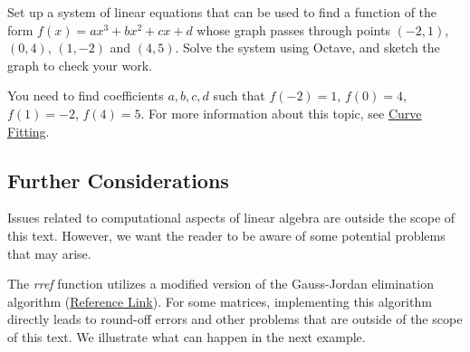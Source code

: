 \documentclass{ximera}
\begin{document}
\begin{problem}\label{prob_oct_sys_4}
    Set up a system of linear equations that can be used to find a function of the form $f(x)=ax^3+bx^2+cx+d$ whose graph passes through points $(-2, 1)$, $(0, 4)$, $(1, -2)$ and $(4, 5)$.   Solve the system using Octave, and sketch the graph to check your work.
    
    \begin{hint}
        You need to find coefficients $a, b, c, d$ such that $f(-2)=1$, $f(0)=4$, $f(1)=-2$, $f(4)=5$.  For more information about this topic, see \href{https://ximera.osu.edu/linearalgebradzv3/LinearAlgebraInteractiveIntro/APP-0070/main}{Curve Fitting}.
    \end{hint}
    

    \begin{center} 
    \end{center}
   
\end{problem}

\subsection*{Further Considerations}
Issues related to computational aspects of linear algebra are outside the scope of this text.  However, we want the reader to be aware of some potential problems that may arise.

\begin{warning}
    The \emph{rref} function utilizes a modified version of the Gauss-Jordan elimination algorithm (\href{https://www.mathworks.com/help/matlab/ref/rref.html}{Reference Link}).  For some matrices, implementing this algorithm directly leads to round-off errors and other problems that are outside of the scope of this text.  %
    We illustrate what can happen in the next example.   
\end{warning}
\end{document}
